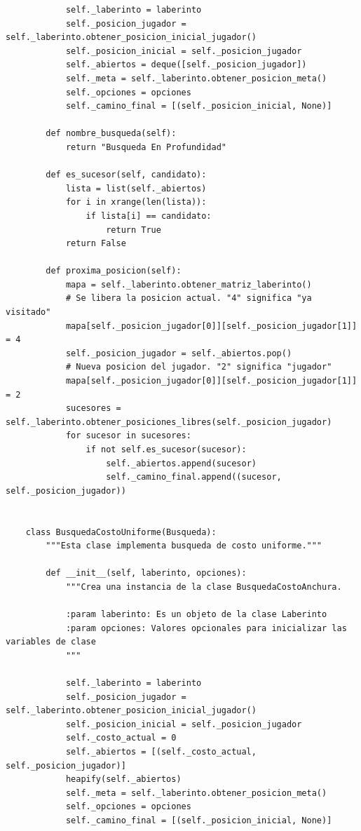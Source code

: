 \documentclass[letter, titlepage, 10pt]{article}
\begin{document}
\begin{lstlisting}
            self._laberinto = laberinto
            self._posicion_jugador = self._laberinto.obtener_posicion_inicial_jugador()
            self._posicion_inicial = self._posicion_jugador
            self._abiertos = deque([self._posicion_jugador])
            self._meta = self._laberinto.obtener_posicion_meta()
            self._opciones = opciones
            self._camino_final = [(self._posicion_inicial, None)]
        
        def nombre_busqueda(self):
            return "Busqueda En Profundidad"
        
        def es_sucesor(self, candidato):
            lista = list(self._abiertos)
            for i in xrange(len(lista)):
                if lista[i] == candidato:
                    return True
            return False
    
        def proxima_posicion(self):
            mapa = self._laberinto.obtener_matriz_laberinto()
            # Se libera la posicion actual. "4" significa "ya visitado"
            mapa[self._posicion_jugador[0]][self._posicion_jugador[1]] = 4
            self._posicion_jugador = self._abiertos.pop()
            # Nueva posicion del jugador. "2" significa "jugador"
            mapa[self._posicion_jugador[0]][self._posicion_jugador[1]] = 2
            sucesores = self._laberinto.obtener_posiciones_libres(self._posicion_jugador)
            for sucesor in sucesores:
                if not self.es_sucesor(sucesor):
                    self._abiertos.append(sucesor)
                    self._camino_final.append((sucesor, self._posicion_jugador))
    
    
    class BusquedaCostoUniforme(Busqueda):
        """Esta clase implementa busqueda de costo uniforme."""
    
        def __init__(self, laberinto, opciones):
            """Crea una instancia de la clase BusquedaCostoAnchura.
            
            :param laberinto: Es un objeto de la clase Laberinto
            :param opciones: Valores opcionales para inicializar las variables de clase
            """
    
            self._laberinto = laberinto
            self._posicion_jugador = self._laberinto.obtener_posicion_inicial_jugador()
            self._posicion_inicial = self._posicion_jugador
            self._costo_actual = 0
            self._abiertos = [(self._costo_actual, self._posicion_jugador)]
            heapify(self._abiertos)
            self._meta = self._laberinto.obtener_posicion_meta()
            self._opciones = opciones
            self._camino_final = [(self._posicion_inicial, None)]
        

\end{lstlisting}
\end{document}
